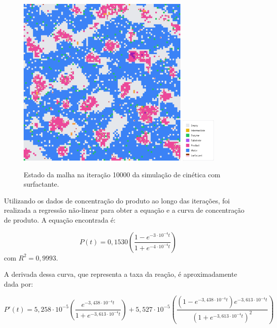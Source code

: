 \documentclass[12pt,oneside]{report}
\begin{document}
\begin{figure}[H]
    \centering
    \includegraphics[width=0.75\textwidth]{img/surf_10000.png}
    \hspace{0.05\textwidth}
    \includegraphics[width=0.15\textwidth]{img/legend_surf.png}
    \caption{\small Estado da malha na iteração 10000 da simulação de cinética com surfactante.}
    \label{fig:MM_surf_10000it}
\end{figure}


Utilizando os dados de concentração do produto ao longo das iterações, foi realizada a regressão não-linear para obter a equação e a curva de concentração de produto. A equação encontrada é:

\begin{equation}
    P(t) = 0{,}1530 \left(\frac{1 - e^{-3 \cdot 10^{-4} t}}{1 + e^{-4 \cdot 10^{-4} t}}\right)
    \label{eq:produto_MM_surfactant}
\end{equation}
com $R^2 = 0{,}9993$.

A derivada dessa curva, que representa a taxa da reação, é aproximadamente dada por:

\begin{equation}
    P'(t) = 5{,}258 \cdot 10^{-5} \left(\frac{e^{-3{,}438 \cdot 10^{-4} t}}{1 + e^{-3{,}613 \cdot 10^{-4} t}}\right) + 5{,}527 \cdot 10^{-5} \left(\frac{(1 - e^{-3{,}438 \cdot 10^{-4} t}) e^{-3{,}613 \cdot 10^{-4} t}}{(1 + e^{-3{,}613 \cdot 10^{-4} t})^2}\right)
    \label{eq:taxa_MM_surfactant}
\end{equation}
\end{document}
